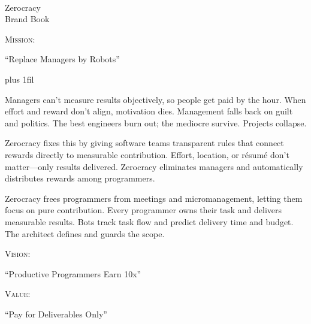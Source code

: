 \documentclass{article}
\newcommand\slide[1]{%
  \pagebreak\topskip0pt\vspace*{\fill}%
  \begin{center}\LARGE%
  #1
  \end{center}%
  \vspace*{\fill}}
\begin{document}
\color{zblack}

\sffamily


\newcommand\header[1]{{\scshape\LARGE #1:\\[1em]\par}}

\slide{%
  \\
  Zerocracy
  \\[1em]
  \large
  Brand Book
  \\
  \textcopyright{} \iexec{date +\%Y}}

\slide{
  \header{Mission}
  \par
  {\Huge \enquote{Replace Managers by Robots}\par}
  \vspace{1em}
  {\rmfamily\normalsize\leftskip=0pt\rightskip=0pt\parfillskip=0pt plus 1fil\setlength{\parindent}{1.5em}\begin{multicols}{3}
  Managers can't measure results objectively, so people get paid by the hour.
  When effort and reward don't align, motivation dies.
  Management falls back on guilt and politics.
  The best engineers burn out; the mediocre survive.
  Projects collapse.
  \par\columnbreak\par
  Zerocracy fixes this by giving software teams transparent rules that connect rewards directly to measurable contribution.
  Effort, location, or r\'{e}sum\'{e} don't matter---only results delivered.
  Zerocracy eliminates managers and automatically distributes rewards among programmers.
  \par\columnbreak\par
  Zerocracy frees programmers from meetings and micromanagement, letting them focus on pure contribution.
  Every programmer owns their task and delivers measurable results.
  Bots track task flow and predict delivery time and budget.
  The architect defines and guards the scope.
  \end{multicols}\par}}

\slide{
  \header{Vision}
  \par
  {\Huge \enquote{Productive Programmers Earn 10x}\par}}

\slide{
  \header{Value}
  \par
  {\Huge \enquote{Pay for Deliverables Only}\par}}
\end{document}
